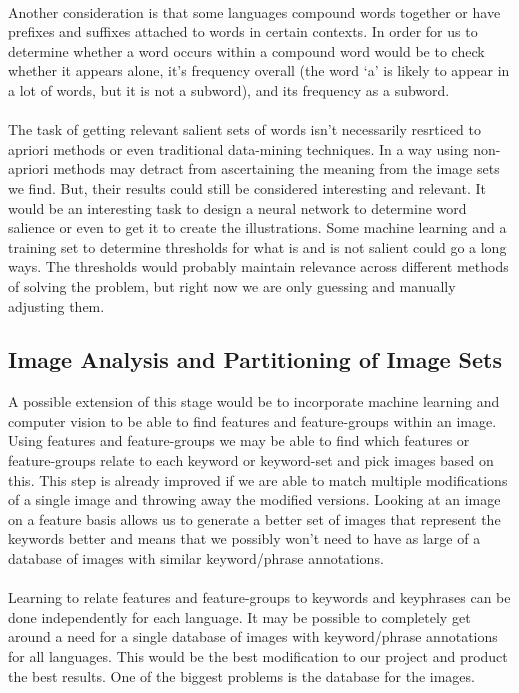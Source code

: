 \documentclass[12pt]{article}
\begin{document}
\paragraph{}
Another consideration is that some languages compound words together or have prefixes and suffixes attached to words in certain contexts. 
In order for us to determine whether a word occurs within a compound word would be to check whether it appears alone, 
it's frequency overall (the word `a' is likely to appear in a lot of words, but it is not a subword), and its frequency as a subword.
\paragraph{}
The task of getting relevant salient sets of words isn't necessarily resrticed to apriori methods or even traditional 
data-mining techniques. In a way using non-apriori methods may detract from ascertaining the meaning from the image sets 
we find. But, their results could still be considered interesting and relevant. It would be an interesting task to design 
a neural network to determine word salience or even to get it to create the illustrations. Some machine learning and a 
training set to determine thresholds for what is and is not salient could go a long ways. The thresholds would probably 
maintain relevance across different methods of solving the problem, but right now we are only guessing and manually 
adjusting them.

\subsection{Image Analysis and Partitioning of Image Sets}
A possible extension of this stage would be to incorporate machine learning and computer vision to be able to find 
features and feature-groups within an image. Using features and feature-groups we may be able to find which features 
or feature-groups relate to each keyword or keyword-set and pick images based on this. This step is already improved 
if we are able to match multiple modifications of a single image and throwing away the modified versions. Looking at 
an image on a feature basis allows us to generate a better set of images that represent the keywords better and means 
that we possibly won't need to have as large of a database of images with similar keyword/phrase annotations.
\paragraph{}
Learning to relate features and feature-groups to keywords and keyphrases can be done independently for each language. 
It may be possible to completely get around a need for a single database of images with keyword/phrase annotations 
for all languages. This would be the best modification to our project and product the best results. One of the biggest 
problems is the database for the images.
\end{document}
